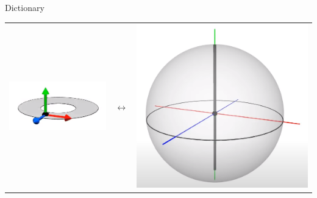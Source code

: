\documentclass[10pt]{beamer}
\begin{document}
\begin{frame}{Dictionary}
\begin{center}
\begin{tabular}{m{3cm} m{2cm} m{3cm}}
        \includegraphics[scale=0.15]{Pictures/yaxisbelt.png} & $\longleftrightarrow$ & \includegraphics[scale=0.1]{Pictures/yaxissphere.png}\\

\end{tabular}
\end{center}
\end{frame}
\end{document}
